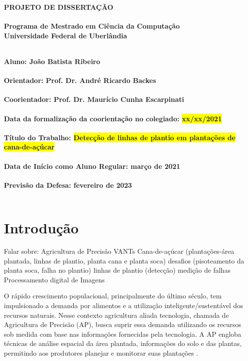 \documentclass[12pt, a4paper, english, brazil]{article}
\newcommand{\textBlue}[1]{{{\color{blue} #1}}}
\begin{document}
\rhead{\thepage}

\begin{center}
	\bf{\LARGE{PROJETO DE DISSERTAÇÃO}\\ $\ $\\}
	\Large{Programa de Mestrado em Ciência da Computação\\
		Universidade Federal de Uberlândia}\\ $\ $\\
\end{center}

\begin{center}
	\bf{Aluno: João Batista Ribeiro\\ $\ $\\
		Orientador: Prof. Dr. André Ricardo Backes\\ $\ $\\
		Coorientador: Prof. Dr. Maurício Cunha Escarpinati\\ $\ $\\
		Data da formalização da coorientação no colegiado: \colorbox{yellow}{xx/xx/2021}\\ $\ $\\
		Título do Trabalho: \colorbox{yellow}{Detecção de linhas de plantio em plantações de cana-de-açúcar}\\ $\ $\\
		Data de Início como Aluno Regular: março de 2021\\ $\ $\\
		Previsão da Defesa: fevereiro de 2023\\ $\ $\\}
\end{center}

\section{Introdução}

\textBlue{
Falar sobre:
Agricultura de Precisão
    VANTs
Cana-de-açúcar (plantações-área plantada, linhas de plantio, planta cana e planta soca)
desafios (pisoteamento da planta soca, falha no plantio)
linhas de plantio (detecção) 
medição de falhas
Processamento digital de Imagens
}


O rápido crescimento populacional, principalmente do último século, tem impulsionado a demanda por alimentos e a utilização inteligente/sustentável dos recursos naturais. Nesse contexto agricultura aliada tecnologia, chamada de Agricultura de Precisão (AP), busca suprir essa demanda utilizando os recursos sob medida com base nas informações fornecidas pela tecnologia. A AP engloba técnicas de análise espacial da área plantada, informações do solo e das plantas, permitindo aos produtores planejar e monitorar suas plantações \cite{Blasch_2020}.
\end{document}
